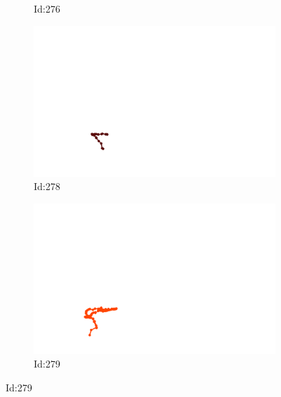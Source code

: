 \documentclass[12pt,twoside]{report}
\begin{document}
\begin{figure}
\begin{subfigure}[b]{0.20\textwidth}
\caption{Id:276}
\end{subfigure}
\begin{subfigure}[b]{0.20\textwidth}
\centering
\includegraphics[width=\textwidth]{../../trajectories/278.png}
\caption{Id:278}
\end{subfigure}
\begin{subfigure}[b]{0.20\textwidth}
\centering
\includegraphics[width=\textwidth]{../../trajectories/279.png}
\caption{Id:279}
\end{subfigure}
\end{figure}
\end{document}
